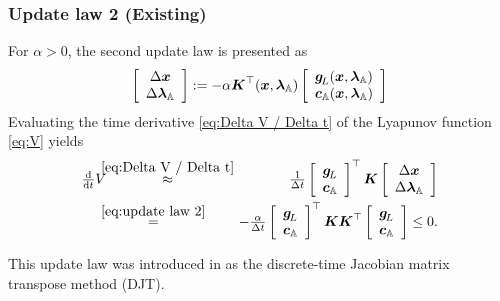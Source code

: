 \documentclass[journal]{IEEEtranTIE}
\newcommand{\KYCH}[1]{{\color{blue} [KC: #1]}} %
\begin{document}
\subsubsection{Update law 2 (Existing)}
For $\alpha >0$, the second update law is presented as 
%
\begin{equation}\label{eq:update law 2}
\left[ {\begin{array}{*{20}{c}}
{\Delta \mv{x}}\\
{\Delta \mv{\lambda}_{\mathbb{A}}}
\end{array}} \right] :=  - \alpha \mm{K}^\top(\mv{x},\mv{\lambda}_{\mathbb{A}})\left[ {\begin{array}{*{20}{c}}
{\mv{g}_{\!L}}(\mv{x},\mv{\lambda}_{\mathbb{A}})\\
{\mv{c}_{\mathbb{A}}}(\mv{x},\mv{\lambda}_{\mathbb{A}})
\end{array}} \right]
\end{equation}
%
Evaluating the time derivative \eqref{eq:Delta V / Delta t} of the Lyapunov function \eqref{eq:V} yields
\begin{eqnarray}
\ddtsmall V & \!\!\!\! \stackrel{\eqref{eq:Delta V / Delta t}}{\approx} \!\!\!\!  & \tfrac{1}{\Delta t}\left[ {\begin{array}{*{20}{c}}
{\mv{g}_{\!L}}\\
{\mv{c}_{\mathbb{A}}}
\end{array}} \right]^\top \mm{K} \left[ {\begin{array}{*{20}{c}}
{\Delta \mv{x}}\\
{\Delta \mv{\lambda}_{\mathbb{A}}}
\end{array}} \right] \notag \\
 & \!\!\!\! \stackrel{\eqref{eq:update law 2}}{=} \!\!\!\! & -\tfrac{\alpha}{\Delta t}\left[ {\begin{array}{*{20}{c}}
{\mv{g}_{\!L}}\\
{\mv{c}_{\mathbb{A}}}
\end{array}} \right]^\top \mm{K}\mm{K}^\top \left[ {\begin{array}{*{20}{c}}
{\mv{g}_{\!L}}\\
{\mv{c}_{\mathbb{A}}}
\end{array}} \right] \le 0.
\end{eqnarray}

This update law was introduced in \cite{bhaya2006control} as the discrete-time Jacobian matrix transpose method (DJT). 
\end{document}
